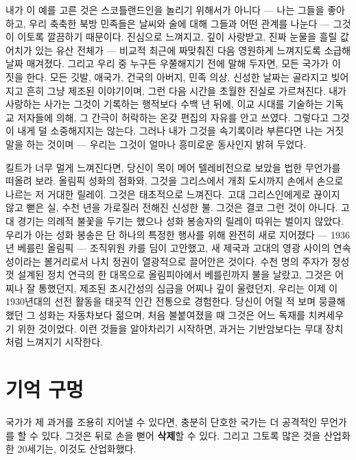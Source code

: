 내가 이 예를 고른 것은 스코틀랜드인을 놀리기 위해서가 아니다 — 나는 그들을 좋아하고, 우리 축축한 북방 민족들은 날씨와 술에 대해 그들과 어떤 관계를 나눈다 — 그것이 이토록 깔끔하기 때문이다. 진심으로 느껴지고, 깊이 사랑받고, 진짜 눈물을 흘릴 값어치가 있는 유산 전체가 — 비교적 최근에 짜맞춰진 다음 영원하게 느껴지도록 소급해 날짜 매겨졌다. 그리고 우리 중 누구든 우쭐해지기 전에 말해 두자면, 모든 국가가 이 짓을 한다. 모든 깃발, 애국가, 건국의 아버지, 민족 의상, 신성한 날짜는 골라지고 빚어지고 흔히 그냥 제조된 이야기이며, 그런 다음 시간을 초월한 진실로 가르쳐진다. 내가 사랑하는 사가는 그것이 기록하는 행적보다 수백 년 뒤에, 이교 시대를 기술하는 기독교 저자들에 의해, 그 간극이 허락하는 온갖 편집의 자유를 안고 쓰였다. 그렇다고 그것이 내게 덜 소중해지지는 않는다. 그러나 내가 그것을 속기록이라 부른다면 나는 거짓말을 하는 것이며 — 우리는 그것이 얼마나 흥미로운 동사인지 밝혀 두었다.

킬트가 너무 멀게 느껴진다면, 당신이 목이 메어 텔레비전으로 보았을 법한 무언가를 떠올려 보라. 올림픽 성화의 점화와, 그것을 그리스에서 개최 도시까지 손에서 손으로 나르는 저 거대한 릴레이. 그것은 태초적으로 느껴진다. 고대 그리스인에게로 끊이지 않고 뻗은 실, 수천 년을 가로질러 전해진 신성한 불. 그것은 결코 그런 것이 아니다. 고대 경기는 의례적 불꽃을 두기는 했으나 성화 봉송자의 릴레이 따위는 벌이지 않았다. 우리가 아는 성화 봉송은 단 하나의 특정한 행사를 위해 완전히 새로 지어졌다 — 1936년 베를린 올림픽 — 조직위원 카를 딤이 고안했고, 새 제국과 고대의 영광 사이의 연속성이라는 볼거리로서 나치 정권이 열광적으로 끌어안은 것이다. 수천 명의 주자가 정성껏 설계된 정치 연극의 한 대목으로 올림피아에서 베를린까지 불을 날랐고, 그것은 어찌나 잘 통했던지, 제조된 초시간성의 심금을 어찌나 깊이 울렸던지, 우리는 이제 이 1930년대의 선전 활동을 태곳적 인간 전통으로 경험한다. 당신이 어릴 적 보며 뭉클해했던 그 성화는 자동차보다 젊으며, 처음 불붙여졌을 때 그것은 어느 독재를 치켜세우기 위한 것이었다. 이런 것들을 알아차리기 시작하면, 과거는 기반암보다는 무대 장치처럼 느껴지기 시작한다.

\section*{기억 구멍}

국가가 제 과거를 조용히 지어낼 수 있다면, 충분히 단호한 국가는 더 공격적인 무언가를 할 수 있다. 그것은 뒤로 손을 뻗어 \textbf{삭제}할 수 있다. 그리고 그토록 많은 것을 산업화한 20세기는, 이것도 산업화했다.

